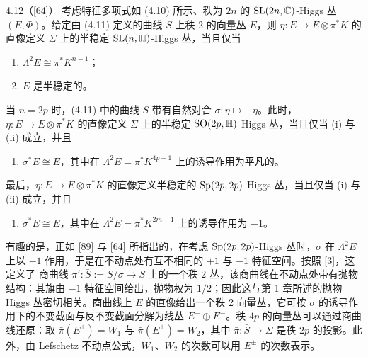 \begin{thm}{4.12（[64]）} 考虑特征多项式如 (4.10) 所示、秩为 $2n$ 的 $\mathrm{SL}(2n,\mathbb{C})$-Higgs 丛 $(E,\Phi)$。给定由 (4.11) 定义的曲线 $S$ 上秩 2 的向量丛 $E$，则 $\eta : E \to E\otimes\pi^*K$ 的直像定义 $\Sigma$ 上的半稳定 $\mathrm{SL}(n,\mathbb{H})$-Higgs 丛，当且仅当
\begin{enumerate}[label=(\roman*),leftmargin=2.2em]
\item $\Lambda^2E \cong \pi^*K^{n-1}$；
\item $E$ 是半稳定的。
\end{enumerate}
当 $n = 2p$ 时，(4.11) 中的曲线 $S$ 带有自然对合 $\sigma : \eta \mapsto -\eta$。此时，$\eta : E \to E\otimes\pi^*K$ 的直像定义 $\Sigma$ 上的半稳定 $\mathrm{SO}(2p,\mathbb{H})$-Higgs 丛，当且仅当 (i) 与 (ii) 成立，并且
\begin{enumerate}[label=(\roman*),leftmargin=2.2em,start=3]
\item $\sigma^*E \cong E$，其中在 $\Lambda^2E = \pi^*K^{4p-1}$ 上的诱导作用为平凡的。
\end{enumerate}
最后，$\eta : E \to E\otimes\pi^*K$ 的直像定义半稳定的 $\mathrm{Sp}(2p,2p)$-Higgs 丛，当且仅当 (i) 与 (ii) 成立，并且
\begin{enumerate}[label=(\roman*),leftmargin=2.2em,start=4]
\item $\sigma^*E \cong E$，其中在 $\Lambda^2E = \pi^*K^{2m-1}$ 上的诱导作用为 $-1$。
\end{enumerate}
\end{thm}

有趣的是，正如 [89] 与 [64] 所指出的，在考虑 $\mathrm{Sp}(2p,2p)$-Higgs 丛时，$\sigma$ 在 $\Lambda^2E$ 上以 $-1$ 作用，于是在不动点处有互不相同的 $+1$ 与 $-1$ 特征空间。按照 [3]，这定义了
商曲线 $\pi' : \bar S := S/\sigma \to S$ 上的一个秩 2 丛，该商曲线在不动点处带有抛物结构：其旗由 $-1$ 特征空间给出，抛物权为 $1/2$；因此这与第 1 章所述的抛物 Higgs 丛密切相关。商曲线上 $E$ 的直像给出一个秩 2 向量丛，它可按 $\sigma$ 的诱导作用下的不变截面与反不变截面分解为线丛 $E^+ \oplus E^-$。秩 $4p$ 的向量丛可以通过商曲线还原：取 $\bar\pi(E^+) = W_1$ 与 $\bar\pi(E^+) = W_2$，其中 $\bar\pi : \bar S \to \Sigma$ 是秩 $2p$ 的投影。此外，由 Lefschetz 不动点公式，$W_1$、$W_2$ 的次数可以用 $E^\pm$ 的次数表示。

